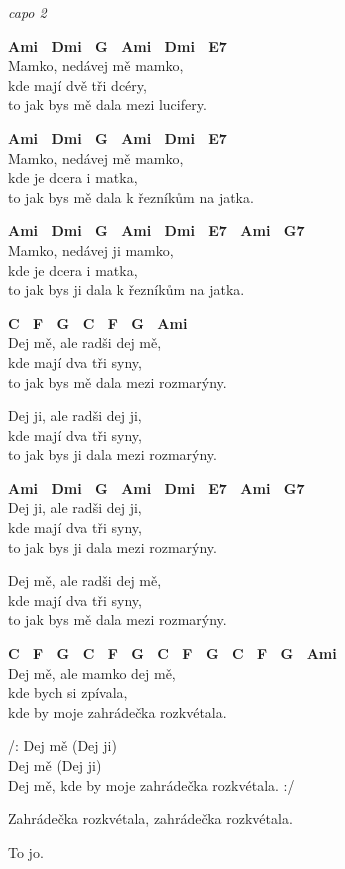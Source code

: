 
\re{}
\textit{capo 2}

\ve{}
\textbf{{\footnotesize Ami \ Dmi \ G \ Ami \ Dmi \ E7}}\\
Mamko, nedávej mě mamko,\\
kde mají dvě tři dcéry,\\
to jak bys mě dala mezi lucifery.

\ve{}
\textbf{{\footnotesize Ami \ Dmi \ G \ Ami \ Dmi \ E7}}\\
Mamko, nedávej mě mamko,\\
kde je dcera i matka,\\
to jak bys mě dala k řezníkům na jatka.

\ve{}
\textbf{{\footnotesize Ami \ Dmi \ G \ Ami \ Dmi \ E7 \ Ami \ G7}}\\
Mamko, nedávej ji mamko,\\
kde je dcera i matka,\\
to jak bys ji dala k řezníkům na jatka.

\ve{}
\textbf{{\footnotesize C \ F \ G \ C \ F \ G \ Ami}}\\
Dej mě, ale radši dej mě,\\
kde mají dva tři syny,\\
to jak bys mě dala mezi rozmarýny.

\ve{}
Dej ji, ale radši dej ji,\\ 
kde mají dva tři syny,\\
to jak bys ji dala mezi rozmarýny.

\ve{}
\textbf{{\footnotesize Ami \ Dmi \ G \ Ami \ Dmi \ E7 \ Ami \ G7}}\\
Dej ji, ale radši dej ji,\\
kde mají dva tři syny,\\
to jak bys ji dala mezi rozmarýny.

\ve{}
Dej mě, ale radši dej mě,\\ 
kde mají dva tři syny,\\   
to jak bys mě dala mezi rozmarýny.

\ve{}
\textbf{{\footnotesize C \ F \ G \ C \ F \ G \ C \ F \ G \ C \ F \ G \ Ami}}\\
Dej mě, ale mamko dej mě,\\    
kde bych si zpívala,\\
kde by moje zahrádečka rozkvétala.

\ve{}
/: Dej mě (Dej ji)\\
Dej mě (Dej ji)\\
Dej mě, kde by moje zahrádečka rozkvétala. :/

\re{}
Zahrádečka rozkvétala, zahrádečka rozkvétala.

\re{}
To jo.

\esong{}